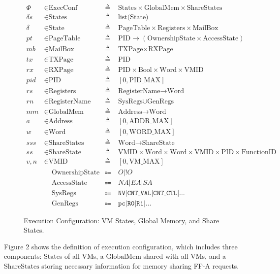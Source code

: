 \documentclass[a4paper]{article}
\newcommand*{\defined}{\triangleq\ }
\newcommand*{\maps}{\rightarrow}
\newcommand*{\derived}{\Coloneqq\ }
\newcommand*{\CONF}{\text{ExecConf}}
\newcommand*{\STATE}{\text{State}}
\newcommand*{\MEM}{\text{GlobalMem}}
\newcommand*{\SSS}{\text{ShareStates}}
\newcommand*{\PID}{\text{PID}}
\newcommand*{\PT}{\text{PageTable}}
\newcommand*{\AS}{\text{AccessState}}
\newcommand*{\OS}{\text{OwnershipState}}
\newcommand*{\REGS}{\text{Registers}}
\newcommand*{\ADDR}{\text{Address}}
\newcommand*{\WORD}{\text{Word}}
\newcommand*{\VMID}{\text{VMID}}
\newcommand*{\REGNAMES}{\text{RegisterName}}
\newcommand*{\MB}{\text{MailBox}}
\newcommand*{\PAMAX}{\text{ADDR\_MAX}}
\newcommand*{\PPIDMAX}{\text{PID\_MAX}}
\newcommand*{\PWMAX}{\text{WORD\_MAX}}
\newcommand*{\PVMMAX}{\text{VM\_MAX}}
\begin{document}
\begin{figure}
  \begin{align*}
    \Phi &\in \CONF &\defined &\text{States} \times \MEM \times \SSS \\
    \delta s &\in \text{States} &\defined &\text{list(State)} \\
    \delta &\in \STATE &\defined &\PT \times \REGS \times \MB \\
    pt & \in \PT & \defined & \PID \maps (\OS \times \AS) \\
    mb & \in \MB &\defined &\text{TXPage} \times  \text{RXPage}\\
    tx & \in \text{TXPage} &\defined &\PID\\
    rx & \in \text{RXPage} &\defined &\PID \times \text{Bool} \times \WORD \times \VMID \\
    pid & \in \PID &\defined  &[ 0, \PPIDMAX ] \\
    rs & \in \REGS &\defined  &\REGNAMES \maps \WORD \\
    rn & \in \REGNAMES &\defined &\text{SysRegs} \cup \text{GenRegs} \\
    mm & \in \MEM &\defined  &\ADDR \maps \WORD \\
    a & \in \ADDR &\defined  &[ 0, \PAMAX ] \\
    w & \in \WORD &\defined  &[ 0, \PWMAX ] \\
    sss & \in \SSS &\defined  &\WORD \maps \text{ShareState} \\
    ss & \in \text{ShareState} &\defined &\VMID \times \WORD \times \WORD \times \VMID \times \PID \times \text{FunctionID}\\
    v,n & \in \VMID &\defined  &[ 0, \PVMMAX ] \\
      & \;\;\;\; \OS & \derived & O | !O \\
      & \;\;\;\; \AS & \derived & NA | EA | SA \\
      & \;\;\;\; \text{SysRegs} &\derived & \mathtt{NV} | \mathtt{CNT\_VAL} | \mathtt{CNT\_CTL} | \dots \\
         & \;\;\;\; \text{GenRegs} &\derived & \mathtt{pc} | \mathtt {R0} | \mathtt{R1} | \dots
  \end{align*}
  \caption{Execution Configuration: VM States, Global Memory, and Share States.}
\end{figure}
Figure 2 shows the definition of execution configuration, which includes three
components: $\STATE$s of all VMs, a $\MEM$ shared with all VMs, and a $\SSS$
storing necessary information for memory sharing FF-A requests.
\end{document}
